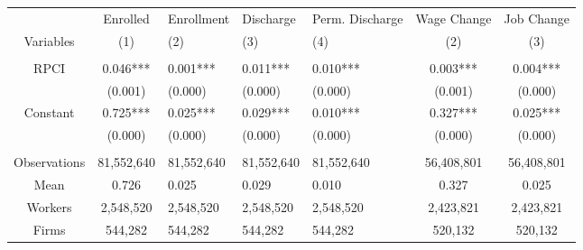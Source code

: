 \begin{tabular}{c|cHHHcc}
\toprule
\toprule
      & Enrolled & Enrollment & Discharge & Perm. Discharge & Wage Change & Job Change \\
Variables & (1) & (2) & (3) & (4) & (2) & (3) \\
\midrule
      &       &       &       &       &       &  \\
RPCI  & 0.046*** & 0.001*** & 0.011*** & 0.010*** & 0.003*** & 0.004*** \\
      & (0.001) & (0.000) & (0.000) & (0.000) & (0.001) & (0.000) \\
Constant & 0.725*** & 0.025*** & 0.029*** & 0.010*** & 0.327*** & 0.025*** \\
      & (0.000) & (0.000) & (0.000) & (0.000) & (0.000) & (0.000) \\
      &       &       &       &       &       &  \\
\midrule
Observations & 81,552,640 & 81,552,640 & 81,552,640 & 81,552,640 & 56,408,801 & 56,408,801 \\
Mean  & 0.726 & 0.025 & 0.029 & 0.010 & 0.327 & 0.025 \\
Workers & 2,548,520 & 2,548,520 & 2,548,520 & 2,548,520 & 2,423,821 & 2,423,821 \\
Firms & 544,282 & 544,282 & 544,282 & 544,282 & 520,132 & 520,132 \\
\bottomrule
\bottomrule
\end{tabular}%
